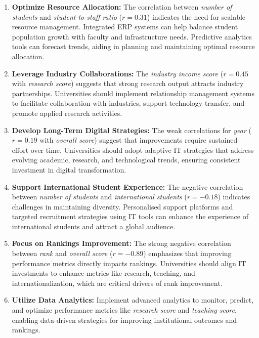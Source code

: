 \documentclass[conference]{IEEEtran}
\begin{document}
\begin{enumerate}
	\item \textbf{Optimize Resource Allocation:} The correlation between \textit{number of students} and \textit{student-to-staff ratio} (\(r = 0.31\)) indicates the need for scalable resource management. Integrated ERP systems can help balance student population growth with faculty and infrastructure needs. Predictive analytics tools can forecast trends, aiding in planning and maintaining optimal resource allocation.
	
	\item \textbf{Leverage Industry Collaborations:} The \textit{industry income score} (\(r = 0.45\) with \textit{research score}) suggests that strong research output attracts industry partnerships. Universities should implement relationship management systems to facilitate collaboration with industries, support technology transfer, and promote applied research activities.
	
	\item \textbf{Develop Long-Term Digital Strategies:} The weak correlations for \textit{year} (\(r = 0.19\) with \textit{overall score}) suggest that improvements require sustained effort over time. Universities should adopt adaptive IT strategies that address evolving academic, research, and technological trends, ensuring consistent investment in digital transformation.
	
	\item \textbf{Support International Student Experience:} The negative correlation between \textit{number of students} and \textit{international students} (\(r = -0.18\)) indicates challenges in maintaining diversity. Personalised support platforms and targeted recruitment strategies using IT tools can enhance the experience of international students and attract a global audience.
	
	\item \textbf{Focus on Rankings Improvement:} The strong negative correlation between \textit{rank} and \textit{overall score} (\(r = -0.89\)) emphasizes that improving performance metrics directly impacts rankings. Universities should align IT investments to enhance metrics like research, teaching, and internationalization, which are critical drivers of rank improvement.
	
	\item \textbf{Utilize Data Analytics:} Implement advanced analytics to monitor, predict, and optimize performance metrics like \textit{research score} and \textit{teaching score}, enabling data-driven strategies for improving institutional outcomes and rankings.
	
\end{enumerate}
\end{document}
